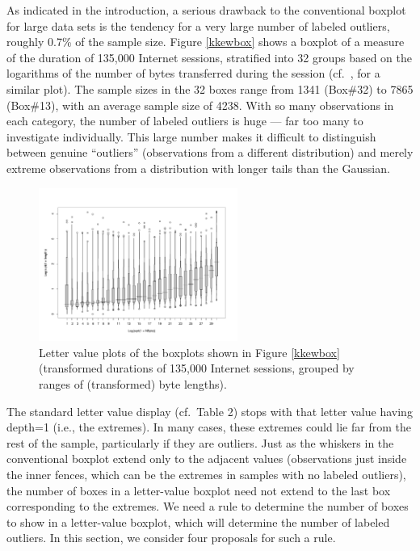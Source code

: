 \documentclass[oneside]{article}
\begin{document}
As indicated in the introduction, a serious
drawback to the conventional boxplot for large
data sets is the tendency for a very large number
of labeled outliers, roughly 0.7\% of the sample size.  
Figure \ref{kkewbox} shows a boxplot of a measure of the 
duration of 135,000 Internet sessions, stratified
into 32 groups based on the logarithms of
the number of bytes transferred during the
session (cf.~\citet{kw06}, for a similar plot).
The sample sizes in the 32 boxes range from 1341 (Box\#32)
to 7865 (Box\#13), with an average sample size of 4238.
With so many observations in each category,
the number of labeled outliers is huge --- far too 
many to investigate individually.  This large number
makes it difficult to distinguish between genuine
``outliers'' (observations from a different distribution)
and merely extreme observations from a distribution with
longer tails than the Gaussian.

\begin{figure}[htbp]
  \centering
  \includegraphics[width=6.5cm,angle=270]{lvbox2}

  \caption{Letter value plots of the boxplots shown in Figure \ref{kkewbox}
  (transformed durations of 135,000 Internet sessions, grouped by ranges of
  (transformed) byte lengths).}
  \label{kkewlv}

\end{figure}


The standard letter value display (cf.~Table 2) stops with
that letter value having depth=1 (i.e., the extremes).
In many cases, these extremes could lie far from the
rest of the sample, particularly if they are outliers.
Just as the whiskers in the conventional boxplot 
extend only to the adjacent values (observations just
inside the inner fences, which can be the extremes
in samples with no labeled outliers), the number
of boxes in a letter-value boxplot need not
extend to the last box corresponding to the extremes.
We need a rule to determine the number of boxes to
show in a letter-value boxplot, which will determine
the number of labeled outliers.
In this section, we consider four proposals for
such a rule.
\end{document}
